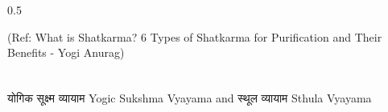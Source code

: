 \begin{frame}[fragile]
\begin{columns}
\begin{column}[T]{0.5\linewidth}
\begin{center}
		{\tiny (Ref: What is Shatkarma? 6 Types of Shatkarma for Purification and Their Benefits - Yogi Anurag)}	
        \end{center}	
    \end{column}
\end{columns}	  
\end{frame}


\begin{frame}[fragile]\frametitle{}
\begin{center}
{\Large योगिक सूक्ष्म व्यायाम  Yogic Sukshma Vyayama and स्थूल व्यायाम Sthula Vyayama}
\end{center}
\end{frame}



